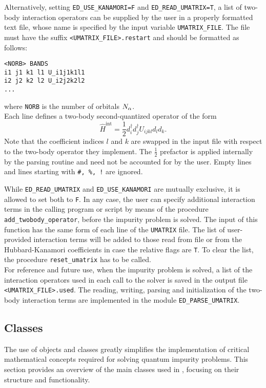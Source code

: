 \documentclass[edipack_sp.tex]{subfiles}
\begin{document}
Alternatively, setting {\tt ED\_USE\_KANAMORI=F} and {\tt ED\_READ\_UMATRIX=T}, a list of two-body interaction operators can be supplied by the user in a properly
formatted text file, whose name is specified by the input variable {\tt UMATRIX\_FILE}.  
The file must have the suffix {\tt <UMATRIX\_FILE>.re\-star\-t} and should be formatted as follows: 
\begin{lstlisting}[style=mybash,numbers=none]
<NORB> BANDS
i1 j1 k1 l1 U_i1j1k1l1
i2 j2 k2 l2 U_i2j2k2l2
...
\end{lstlisting}
where {\tt NORB} is the number of orbitals $N_\alpha$.\\
Each line defines a two-body second-quantized operator of the form 
$$
\hat{H}^{\mathrm{int}}=\frac{1}{2}d^{\dagger}_{i}d^{\dagger}_{j}U_{ijkl}d_{l}d_{k}.
$$
Note that the coefficient indices $l$ and $k$ are swapped in the input file with respect to the two-body operator they implement. The $\tfrac{1}{2}$ prefactor is applied internally by the parsing routine and need not be accounted for by the user.
Empty lines and lines starting with {\tt \#, \%, !} are ignored.

While {\tt ED\_READ\_UMATRIX} and {\tt ED\_USE\_KANAMORI}
are mutually exclusive, it is allowed to set both to {\tt F}. 
In any case, the user can specify additional interaction terms in the calling program or script by means of the procedure {\tt add\_twobody\_operator}, before the impurity problem is solved. The input of this function has the same form of each line of the {\tt UMATRIX} file. The list of user-provided interaction terms will be added to those read from file or from the Hubbard-Kanamori coefficients in case the relative flags are {\tt T}. To clear the list, the procedure {\tt reset\_umatrix} has to be called.\\
For reference and future use, when the impurity problem is solved, a list of the interaction operators used in each call to the solver is saved in the output file 
{\tt <UMATRIX\_FILE>.used}.
The reading, writing, parsing and initialization of the two-body interaction terms are implemented in the module {\tt ED\_PARSE\_UMATRIX}.
















\subsection{Classes}
The use of objects and classes greatly simplifies the implementation of critical mathematical concepts required for solving quantum 
impurity problems. This section provides an overview of the main 
classes used in \NAME, focusing on their structure and functionality.
\end{document}
